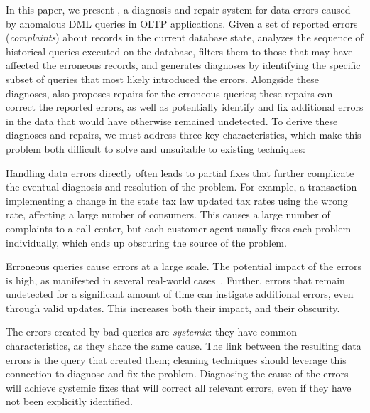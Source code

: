 In this paper, we present \sys, a diagnosis and repair system for data
errors caused by anomalous DML queries in OLTP applications. Given a
set of reported errors (\emph{complaints}) about records in the current database state, \sys
analyzes the sequence of historical queries executed on the database, 
filters them to those that may have affected the erroneous records,  and
generates diagnoses by identifying the specific subset of queries that
most likely introduced the errors. Alongside these diagnoses, \sys also
proposes repairs for the erroneous queries; these repairs can correct the
reported errors, as well as potentially identify and fix 
additional errors in the data that would have otherwise remained
undetected. To derive these diagnoses and repairs, we must address three
key characteristics, which make this problem both difficult to solve
and unsuitable to existing techniques:
\begin{description}[leftmargin=*, topsep=0mm, itemsep=0mm, parsep=1mm]
\item[Obscurity.] Handling data errors directly often leads to partial
fixes that further complicate the eventual diagnosis and resolution of
the problem. For example, a transaction implementing a change in the
state tax law updated tax rates using the wrong rate, affecting a
large number of consumers. This causes a large number of complaints to
a call center, but each customer agent usually fixes each problem
individually, which ends up obscuring the source of the problem.

\item[Large impact.] Erroneous queries cause errors at a large scale.
The potential impact of the errors is high, as manifested in several
real-world cases~\cite{Yates10, Grady13, sakalerrors}. Further, errors
that remain undetected for a significant amount of time can instigate
additional errors, even through valid updates. This increases both
their impact, and their obscurity.

\item[Systemic errors.] The errors created by bad queries are
\emph{systemic}: they have common characteristics, as they share the
same cause. The link between the resulting data errors is the query
that created them; cleaning techniques should leverage this connection
to diagnose and fix the problem. Diagnosing the cause of the errors
will achieve systemic fixes that will correct all relevant errors,
even if they have not been explicitly identified. 

\end{description}
